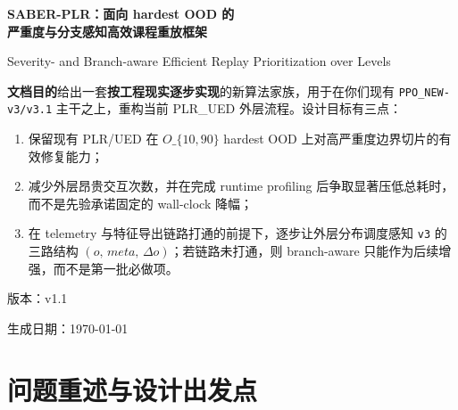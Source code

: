 \documentclass[11pt,a4paper]{ctexart}
\begin{document}
\begin{titlepage}
\centering
\vspace*{2.0cm}
{\Huge\bfseries SABER-PLR：面向 hardest OOD 的\\[0.4em]严重度与分支感知高效课程重放框架\par}
\vspace{1.0cm}
{\Large Severity- and Branch-aware Efficient Replay Prioritization over Levels\par}
\vspace{1.6cm}
\begin{tcolorbox}[colback=blue!3,colframe=MidnightBlue,boxrule=0.8pt,width=0.92\textwidth]
\textbf{文档目的}\quad 给出一套\textbf{按工程现实逐步实现}的新算法家族，用于在你们现有 \texttt{PPO\_NEW-v3/v3.1} 主干之上，重构当前 PLR\_UED 外层流程。设计目标有三点：
\begin{enumerate}[leftmargin=2.2em,itemsep=0.25em]
    \item 保留现有 PLR/UED 在 \(O\_\{10,90\}\) hardest OOD 上对高严重度边界切片的有效修复能力；
    \item 减少外层昂贵交互次数，并在完成 runtime profiling 后争取显著压低总耗时，而不是先验承诺固定的 wall-clock 降幅；
    \item 在 telemetry 与特征导出链路打通的前提下，逐步让外层分布调度感知 \texttt{v3} 的三路结构 \((o,\,meta,\,\Delta o)\)；若链路未打通，则 branch-aware 只能作为后续增强，而不是第一批必做项。
\end{enumerate}
\end{tcolorbox}
\vfill
{\large 版本：v1.1\par}
{\large 生成日期：\today\par}
\end{titlepage}

\tableofcontents
\newpage

\section{问题重述与设计出发点}
\end{document}
